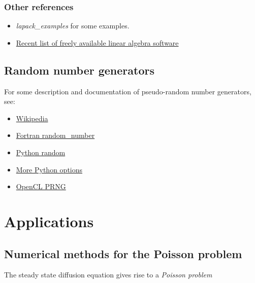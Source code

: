 \documentclass[letterpaper,10pt,english]{sphinxmanual}
\begin{document}
\subsection{Other references}
\label{linalg:other-references}\begin{itemize}
\item {} 
\emph{lapack\_examples} for some examples.

\item {} 
\href{http://www.netlib.org/utk/people/JackDongarra/la-sw.html}{Recent list of freely available linear algebra software}

\end{itemize}


\section{Random number generators}
\label{random:random-number-generators}\label{random:random}\label{random::doc}
For some description and documentation of pseudo-random number generators,
see:
\begin{itemize}
\item {} 
\href{https://en.wikipedia.org/wiki/Pseudorandom\_number\_generator}{Wikipedia}

\item {} 
\href{http://gcc.gnu.org/onlinedocs/gfortran/RANDOM\_005fNUMBER.html}{Fortran random\_number}

\item {} 
\href{http://docs.python.org/2/library/random.html}{Python random}

\item {} 
\href{http://docs.scipy.org/doc/numpy/reference/routines.random.html}{More Python options}

\item {} 
\href{http://mira.math.udel.edu/ParallelKMC/doku.php?id=software}{OpenCL PRNG}

\end{itemize}


\chapter{Applications}
\label{index:applications}\label{index:toc-apps}

\section{Numerical methods for the Poisson problem}
\label{poisson:numerical-methods-for-the-poisson-problem}\label{poisson::doc}\label{poisson:poisson}
The steady state diffusion equation gives rise to a \emph{Poisson problem}
\end{document}
